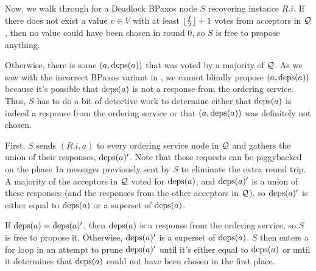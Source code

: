 Now, we walk through  for a Deadlock BPaxos node $S$
recovering instance $R.i$. If there does not exist a value $v \in V$ with at
least $\lfloor\frac{f}{2}\rfloor + 1$ votes from acceptors in $\mathcal{Q}$, then no value
could have been chosen in round $0$, so $S$ is free to propose anything.

Otherwise, there is some $(a, \text{deps}(a))$ that was voted by a majority of
$\mathcal{Q}$. As we saw with the incorrect BPaxos variant in
, we cannot blindly propose $(a, \text{deps}(a))$ because
it's possible that $\text{deps}(a)$ is not a response from the ordering service.
Thus, $S$ has to do a bit of detective work to determine either that $\text{deps}(a)$
is indeed a response from the ordering service or that $(a, \text{deps}(a))$ was
definitely not chosen.

First, $S$ sends $(R.i, a)$ to every ordering service node in $\mathcal{Q}$ and
gathers the union of their responses, $\text{deps}(a)'$. Note that these requests can
be piggybacked on the phase 1a messages previously sent by $S$ to eliminate the
extra round trip. A majority of the acceptors in $\mathcal{Q}$ voted for
$\text{deps}(a)$, and $\text{deps}(a)'$ is a union of these responses (and the responses
from the other acceptors in $\mathcal{Q}$), so $\text{deps}(a)'$ is either equal to
$\text{deps}(a)$ or a superset of $\text{deps}(a)$.

If $\text{deps}(a) = \text{deps}(a)'$, then $\text{deps}(a)$ is a response from the ordering
service, so $S$ is free to propose it. Otherwise, $\text{deps}(a)'$ is a superset of
$\text{deps}(a)$. $S$ then enters a for loop in an attempt to prune $\text{deps}(a)'$ until
it's either equal to $\text{deps}(a)$ or until it determines that $\text{deps}(a)$ could
not have been chosen in the first place.

